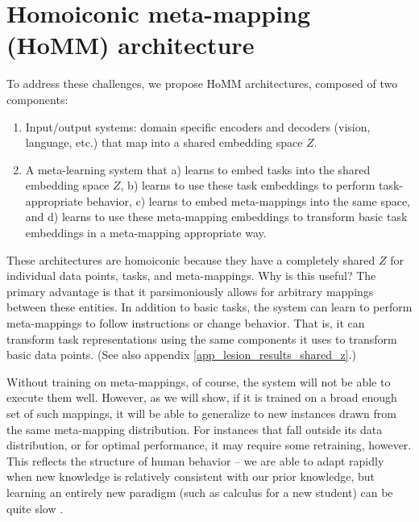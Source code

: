 \documentclass{article}
\begin{document}
\section{Homoiconic meta-mapping (HoMM) architecture}
To address these challenges, we propose HoMM architectures, composed of two components: 
\vspace{-0.5em}
\begin{enumerate} \setlength \itemsep{0em}
\item Input/output systems: domain specific encoders and decoders (vision, language, etc.) that map into a shared embedding space $Z$.
\item A meta-learning system that a) learns to embed tasks into the shared embedding space $Z$, b) learns to use these task embeddings to perform task-appropriate behavior, c) learns to embed meta-mappings into the same space, and d) learns to use these meta-mapping embeddings to transform basic task embeddings in a meta-mapping appropriate way.\end{enumerate}
\vspace{-0.5em}
These architectures are homoiconic because they have a completely shared $Z$ for individual data points, tasks, and meta-mappings. Why is this useful? The primary advantage is that it parsimoniously allows for arbitrary mappings between these entities. In addition to basic tasks, the system can learn to perform meta-mappings to follow instructions or change behavior. That is, it can transform task representations using the same components it uses to transform basic data points. (See also appendix \ref{app_lesion_results_shared_z}.) \par
Without training on meta-mappings, of course, the system will not be able to execute them well. However, as we will show, if it is trained on a broad enough set of such mappings, it will be able to generalize to new instances drawn from the same meta-mapping distribution. For instances that fall outside its data distribution, or for optimal performance, it may require some retraining, however. This reflects the structure of human behavior -- we are able to adapt rapidly when new knowledge is relatively consistent with our prior knowledge, but learning an entirely new paradigm (such as calculus for a new student) can be quite slow \citep[cf.][]{Kumaran2016, Botvinick2019}. \par 
\end{document}
